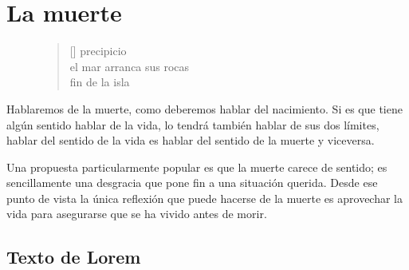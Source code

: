 \chapter{La muerte}

\begin{figure}
\settowidth{\versewidth}{sus sombras las persiguen }
\begin{verse}[\versewidth]
\vin precipicio\\
el mar arranca sus rocas\\
\vin fin de la isla
\end{verse}
\end{figure}

Hablaremos de la muerte, como deberemos hablar del nacimiento. Si es que tiene algún sentido hablar de la vida, lo tendrá también hablar de sus dos límites, hablar del sentido de la vida es hablar del sentido de la muerte y viceversa.

Una propuesta particularmente popular es que la muerte carece de sentido; es sencillamente una desgracia que pone fin a una situación querida. Desde ese punto de vista la única reflexión que puede hacerse de la muerte es aprovechar la vida para asegurarse que se ha vivido antes de morir.

\section{Texto de Lorem}

\lipsum